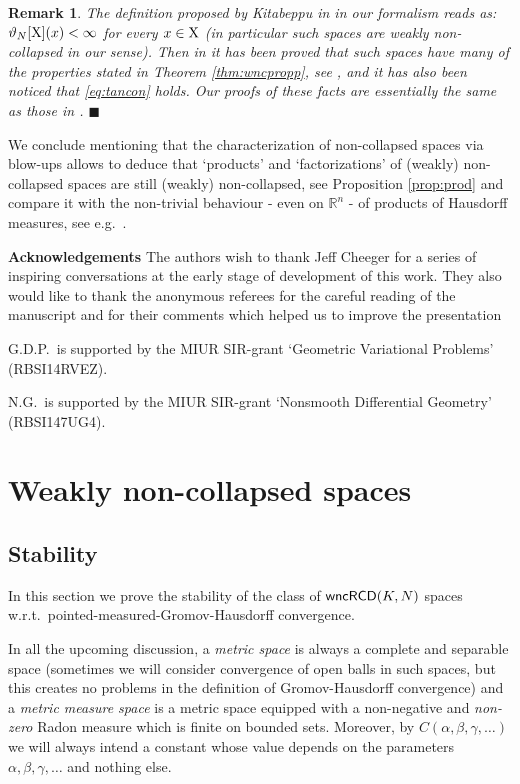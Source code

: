 \documentclass[reqno,11pt]{article}
\numberwithin{equation}{section}
\newcommand{\R}{\mathbb{R}}
\newcommand{\fr}{\penalty-20\null\hfill$\blacksquare$}                      %
\newtheorem{remark}[theorem]{Remark}
\newcommand{\X}{{\rm X}}
\newcommand{\wncRCD}{{\sf wncRCD}}
\begin{document}
\begin{remark}\label{re:Kita}{\rm The definition proposed by Kitabeppu in \cite{Kita17} in our formalism reads as:  $\vartheta_N[\X](x)<\infty$ for \emph{every} $x\in\X$ (in particular such  spaces are weakly non-collapsed in our sense). Then in \cite{Kita17}  it has been proved that such spaces have many of the  properties stated in Theorem \ref{thm:wncpropp}, see \cite[Theorem 1.4]{Kita17}, and it has also been noticed that \eqref{eq:tancon} holds. Our proofs of these facts are essentially the same as those in \cite{Kita17}.
}\fr\end{remark}

We conclude mentioning that   the characterization of non-collapsed spaces via blow-ups allows to deduce that `products' and `factorizations' of (weakly) non-collapsed spaces are still (weakly) non-collapsed, see Proposition \ref{prop:prod} and compare it with the non-trivial behaviour - even on $\R^n$ - of products of Hausdorff measures, see e.g.\ \cite[2.10.29]{Federer69}.

\bigskip

{\bf Acknowledgements} The authors wish to thank Jeff Cheeger for a series of inspiring conversations at the early stage of development of this work. { They also would like to thank the anonymous referees for the careful reading of the manuscript and for their comments which helped us to improve the presentation}

\noindent G.D.P.\ is supported by the MIUR SIR-grant `Geometric Variational Problems' (RBSI14RVEZ). 

\noindent N.G.\ is supported by the MIUR SIR-grant `Nonsmooth Differential Geometry' (RBSI147UG4).

\section{Weakly non-collapsed spaces}
\subsection{Stability}\label{se:stab}
In this section we  prove the stability of the class of $\wncRCD(K,N)$ spaces w.r.t.\ pointed-measured-Gromov-Hausdorff convergence.

 In all the upcoming discussion, a \emph{metric space} is always a complete and separable space (sometimes we will consider convergence of open balls in such spaces, but this creates no problems in the definition of Gromov-Hausdorff convergence) and a \emph{metric measure space} is a metric space equipped with a non-negative and {\em non-zero} Radon measure which is finite on bounded sets. { Moreover, by $C(\alpha,\beta,\gamma,\ldots)$ we will always intend a constant whose value depends on the parameters $\alpha,\beta,\gamma,\ldots$ and nothing else.}
\end{document}
